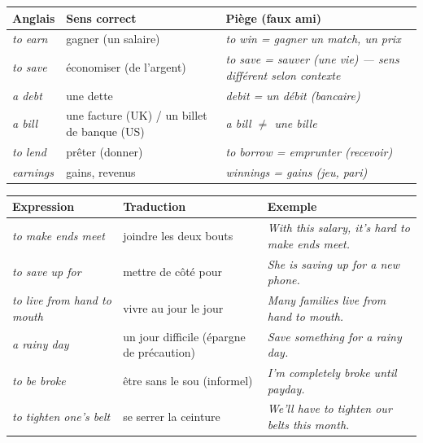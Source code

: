 \documentclass[11pt]{article}
\newcommand{\eng}[1]{\ifmmode\text{\textit{#1}}\else\begingroup\selectlanguage{english}\itshape #1\endgroup\fi}
\begin{document}
\begin{propriete}
\begin{center}
\begin{tabularx}{\linewidth}{|X|X|X|}
\hline
\rowcolor{popblueL} \textbf{Anglais} & \textbf{Sens correct} & \textbf{Piège (faux ami)} \\
\hline
\eng{to earn} & gagner (un salaire) & \eng{to win} = gagner un match, un prix \\
\hline
\eng{to save} & économiser (de l'argent) & \eng{to save} = sauver (une vie) — sens différent selon contexte \\
\hline
\eng{a debt} & une dette & \eng{debit} = un débit (bancaire) \\
\hline
\eng{a bill} & une facture (UK) / un billet de banque (US) & \eng{a bill} $\neq$ une bille \\
\hline
\eng{to lend} & prêter (donner) & \eng{to borrow} = emprunter (recevoir) \\
\hline
\eng{earnings} & gains, revenus & \eng{winnings} = gains (jeu, pari) \\
\hline
\end{tabularx}
\end{center}
\end{propriete}

\begin{propriete}
\begin{center}
\begin{tabularx}{\linewidth}{|X|X|X|}
\hline
\rowcolor{popgreenL} \textbf{Expression} & \textbf{Traduction} & \textbf{Exemple} \\
\hline
\eng{to make ends meet} & joindre les deux bouts & \eng{With this salary, it's hard to make ends meet.} \\
\hline
\eng{to save up for} & mettre de côté pour & \eng{She is saving up for a new phone.} \\
\hline
\eng{to live from hand to mouth} & vivre au jour le jour & \eng{Many families live from hand to mouth.} \\
\hline
\eng{a rainy day} & un jour difficile (épargne de précaution) & \eng{Save something for a rainy day.} \\
\hline
\eng{to be broke} & être sans le sou (informel) & \eng{I'm completely broke until payday.} \\
\hline
\eng{to tighten one's belt} & se serrer la ceinture & \eng{We'll have to tighten our belts this month.} \\
\hline
\end{tabularx}
\end{center}
\end{propriete}
\end{document}
